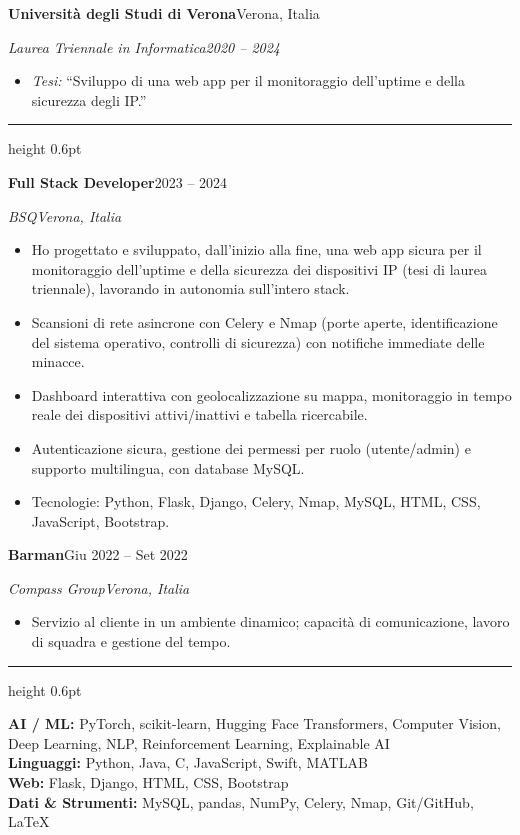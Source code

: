 \documentclass[a4paper,11pt]{article}
\newcommand{\cvsec}[1]{\vspace{7pt}{\large\scshape #1}\par\vspace{1.5pt}\hrule height 0.6pt\vspace{5pt}}
\newcommand{\cventry}[4]{\textbf{#1}\hfill #2\par\textit{#3}\hfill\textit{#4}\par\vspace{1pt}}
\begin{document}
\cventry{Università degli Studi di Verona}{Verona, Italia}{Laurea Triennale in Informatica}{2020 -- 2024}
\begin{itemize}
  \item \textit{Tesi:} ``Sviluppo di una web app per il monitoraggio dell'uptime e della sicurezza degli IP.''
\end{itemize}

\cvsec{Esperienza}

\cventry{Full Stack Developer}{2023 -- 2024}{BSQ}{Verona, Italia}
\begin{itemize}
  \item Ho progettato e sviluppato, dall'inizio alla fine, una web app sicura per il monitoraggio dell'uptime e della sicurezza dei dispositivi IP (tesi di laurea triennale), lavorando in autonomia sull'intero stack.
  \item Scansioni di rete asincrone con Celery e Nmap (porte aperte, identificazione del sistema operativo, controlli di sicurezza) con notifiche immediate delle minacce.
  \item Dashboard interattiva con geolocalizzazione su mappa, monitoraggio in tempo reale dei dispositivi attivi/inattivi e tabella ricercabile.
  \item Autenticazione sicura, gestione dei permessi per ruolo (utente/admin) e supporto multilingua, con database MySQL.
  \item Tecnologie: Python, Flask, Django, Celery, Nmap, MySQL, HTML, CSS, JavaScript, Bootstrap.
\end{itemize}

\cventry{Barman}{Giu 2022 -- Set 2022}{Compass Group}{Verona, Italia}
\begin{itemize}
  \item Servizio al cliente in un ambiente dinamico; capacità di comunicazione, lavoro di squadra e gestione del tempo.
\end{itemize}

\cvsec{Competenze Tecniche}

\textbf{AI / ML:} PyTorch, scikit-learn, Hugging Face Transformers, Computer Vision, Deep Learning, NLP, Reinforcement Learning, Explainable AI \\[3pt]
\textbf{Linguaggi:} Python, Java, C, JavaScript, Swift, MATLAB \\[3pt]
\textbf{Web:} Flask, Django, HTML, CSS, Bootstrap \\[3pt]
\textbf{Dati \& Strumenti:} MySQL, pandas, NumPy, Celery, Nmap, Git/GitHub, LaTeX
\end{document}

